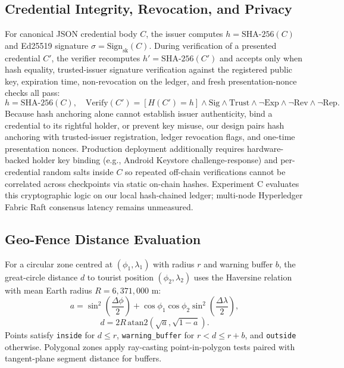 \documentclass[conference]{IEEEtran}
\begin{document}
\subsection{Credential Integrity, Revocation, and Privacy}
For canonical JSON credential body $C$, the issuer computes $h = \text{SHA-256}(C)$ and Ed25519 signature $\sigma = \text{Sign}_{\text{sk}}(C)$. During verification of a presented credential $C'$, the verifier recomputes $h' = \text{SHA-256}(C')$ and accepts only when hash equality, trusted-issuer signature verification against the registered public key, expiration time, non-revocation on the ledger, and fresh presentation-nonce checks all pass:
\begin{equation}
h = \text{SHA-256}(C), \quad \text{Verify}(C') = [H(C') = h] \wedge \text{Sig} \wedge \text{Trust} \wedge \neg\text{Exp} \wedge \neg\text{Rev} \wedge \neg\text{Rep}.
\label{eq:vc}
\end{equation}
Because hash anchoring alone cannot establish issuer authenticity, bind a credential to its rightful holder, or prevent key misuse, our design pairs hash anchoring with trusted-issuer registration, ledger revocation flags, and one-time presentation nonces. Production deployment additionally requires hardware-backed holder key binding (e.g., Android Keystore challenge-response) and per-credential random salts inside $C$ so repeated off-chain verifications cannot be correlated across checkpoints via static on-chain hashes. Experiment C evaluates this cryptographic logic on our local hash-chained ledger; multi-node Hyperledger Fabric Raft consensus latency remains unmeasured.

\subsection{Geo-Fence Distance Evaluation}
For a circular zone centred at $(\phi_1, \lambda_1)$ with radius $r$ and warning buffer $b$, the great-circle distance $d$ to tourist position $(\phi_2, \lambda_2)$ uses the Haversine relation with mean Earth radius $R = 6{,}371{,}000\text{~m}$:
\begin{equation}
a = \sin^2\!\left(\frac{\Delta\phi}{2}\right) + \cos\phi_1 \cos\phi_2 \sin^2\!\left(\frac{\Delta\lambda}{2}\right),
\label{eq:hav_a}
\end{equation}
\begin{equation}
d = 2R\,\text{atan2}\!\left(\sqrt{a}, \sqrt{1-a}\right).
\label{eq:hav_d}
\end{equation}
Points satisfy \texttt{inside} for $d \le r$, \texttt{warning\_buffer} for $r < d \le r + b$, and \texttt{outside} otherwise. Polygonal zones apply ray-casting point-in-polygon tests paired with tangent-plane segment distance for buffers.
\end{document}
